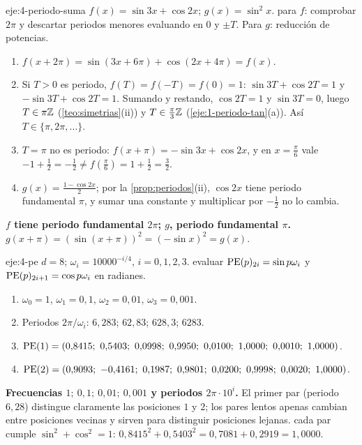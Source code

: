 \begin{solucion}{eje:4-periodo-suma}
\datos $f(x)=\sin3x+\cos2x$; $g(x)=\sin^{2}x$.
\planteamiento para $f$: comprobar $2\pi$ y descartar periodos menores evaluando en $0$ y $\pm T$. Para $g$: reducción de potencias.
\pasos
\begin{enumerate}[label=\arabic*.]
  \item $f(x+2\pi)=\sin(3x+6\pi)+\cos(2x+4\pi)=f(x)$.
  \item Si $T>0$ es periodo, $f(T)=f(-T)=f(0)=1$: $\sin3T+\cos2T=1$ y $-\sin3T+\cos2T=1$. Sumando y restando, $\cos2T=1$ y $\sin3T=0$, luego $T\in\pi\mathbb{Z}$ (\cref{teo:simetrias}(ii)) y $T\in\frac{\pi}{3}\mathbb{Z}$ (\cref{eje:1-periodo-tan}(a)). Así $T\in\{\pi,2\pi,\dots\}$.
  \item $T=\pi$ no es periodo: $f(x+\pi)=-\sin3x+\cos2x$, y en $x=\frac{\pi}{6}$ vale $-1+\frac12=-\frac12\ne f(\frac{\pi}{6})=1+\frac12=\frac32$.
  \item $g(x)=\frac{1-\cos2x}{2}$; por la \cref{prop:periodos}(ii), $\cos2x$ tiene periodo fundamental $\pi$, y sumar una constante y multiplicar por $-\frac12$ no lo cambia.
\end{enumerate}
\resultado \textbf{$f$ tiene periodo fundamental $2\pi$; $g$, periodo fundamental $\pi$.}
\comprobacion $g(x+\pi)=(\sin(x+\pi))^{2}=(-\sin x)^{2}=g(x)$.
\end{solucion}

\begin{solucion}{eje:4-pe}
\datos $d=8$; $\omega_i=10000^{-i/4}$, $i=0,1,2,3$.
\planteamiento evaluar $\operatorname{PE}(p)_{2i}=\sin p\omega_i$ y $\operatorname{PE}(p)_{2i+1}=\cos p\omega_i$ en radianes.
\pasos
\begin{enumerate}[label=\arabic*.]
  \item $\omega_0=1$, $\omega_1=0{,}1$, $\omega_2=0{,}01$, $\omega_3=0{,}001$.
  \item Periodos $2\pi/\omega_i$: $6{,}283$; $62{,}83$; $628{,}3$; $6283$.
  \item $\PE(1)=(0{,}8415;\ 0{,}5403;\ 0{,}0998;\ 0{,}9950;\ 0{,}0100;\ 1{,}0000;\ 0{,}0010;\ 1{,}0000)$.
  \item $\PE(2)=(0{,}9093;\ -0{,}4161;\ 0{,}1987;\ 0{,}9801;\ 0{,}0200;\ 0{,}9998;\ 0{,}0020;\ 1{,}0000)$.
\end{enumerate}
\resultado \textbf{Frecuencias $1;\ 0{,}1;\ 0{,}01;\ 0{,}001$ y periodos $2\pi\cdot10^{i}$.} El primer par (periodo $6{,}28$) distingue claramente las posiciones $1$ y $2$; los pares lentos apenas cambian entre posiciones vecinas y sirven para distinguir posiciones lejanas.
\comprobacion cada par cumple $\sin^{2}+\cos^{2}=1$: $0{,}8415^{2}+0{,}5403^{2}=0{,}7081+0{,}2919=1{,}0000$.
\end{solucion}

